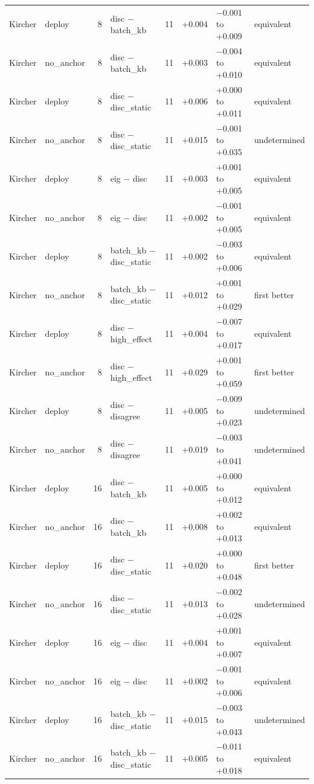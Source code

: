 {\begin{longtable}{llrlrrll}
Kircher & deploy & 8 & disc $-$ batch\_kb & 11 & +0.004 & $-$0.001 to +0.009 & equivalent  \\
Kircher & no\_anchor & 8 & disc $-$ batch\_kb & 11 & +0.003 & $-$0.004 to +0.010 & equivalent  \\
Kircher & deploy & 8 & disc $-$ disc\_static & 11 & +0.006 & +0.000 to +0.011 & equivalent  \\
Kircher & no\_anchor & 8 & disc $-$ disc\_static & 11 & +0.015 & $-$0.001 to +0.035 & undetermined \\
Kircher & deploy & 8 & eig $-$ disc & 11 & +0.003 & +0.001 to +0.005 & equivalent  \\
Kircher & no\_anchor & 8 & eig $-$ disc & 11 & +0.002 & $-$0.001 to +0.005 & equivalent  \\
Kircher & deploy & 8 & batch\_kb $-$ disc\_static & 11 & +0.002 & $-$0.003 to +0.006 & equivalent  \\
Kircher & no\_anchor & 8 & batch\_kb $-$ disc\_static & 11 & +0.012 & +0.001 to +0.029 & first better \\
Kircher & deploy & 8 & disc $-$ high\_effect & 11 & +0.004 & $-$0.007 to +0.017 & equivalent  \\
Kircher & no\_anchor & 8 & disc $-$ high\_effect & 11 & +0.029 & +0.001 to +0.059 & first better \\
Kircher & deploy & 8 & disc $-$ disagree & 11 & +0.005 & $-$0.009 to +0.023 & undetermined \\
Kircher & no\_anchor & 8 & disc $-$ disagree & 11 & +0.019 & $-$0.003 to +0.041 & undetermined \\
Kircher & deploy & 16 & disc $-$ batch\_kb & 11 & +0.005 & +0.000 to +0.012 & equivalent  \\
Kircher & no\_anchor & 16 & disc $-$ batch\_kb & 11 & +0.008 & +0.002 to +0.013 & equivalent  \\
Kircher & deploy & 16 & disc $-$ disc\_static & 11 & +0.020 & +0.000 to +0.048 & first better \\
Kircher & no\_anchor & 16 & disc $-$ disc\_static & 11 & +0.013 & $-$0.002 to +0.028 & undetermined \\
Kircher & deploy & 16 & eig $-$ disc & 11 & +0.004 & +0.001 to +0.007 & equivalent  \\
Kircher & no\_anchor & 16 & eig $-$ disc & 11 & +0.002 & $-$0.001 to +0.006 & equivalent  \\
Kircher & deploy & 16 & batch\_kb $-$ disc\_static & 11 & +0.015 & $-$0.003 to +0.043 & undetermined \\
Kircher & no\_anchor & 16 & batch\_kb $-$ disc\_static & 11 & +0.005 & $-$0.011 to +0.018 & equivalent  \\

\end{longtable}}
